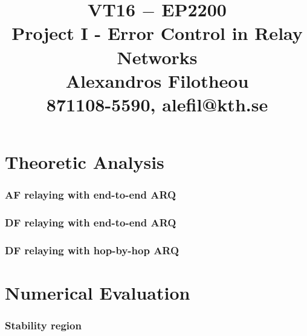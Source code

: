 \documentclass[a4paper,12pt,oneside,onecolumn]{article} %
\title{VT16 $-$ EP2200 \\
  Project I - Error Control in Relay Networks \\
  Alexandros Filotheou \\
  871108-5590, alefil@kth.se }
\date{}
\begin{document}
	\maketitle

  \part*{Theoretic Analysis}

    \section{AF relaying with end-to-end ARQ}
    

    \section{DF relaying with end-to-end ARQ}
    

    \section{DF relaying with hop-by-hop ARQ}
    


  \newpage
  \part*{Numerical Evaluation}

    \section{Stability region}
    
\end{document}
